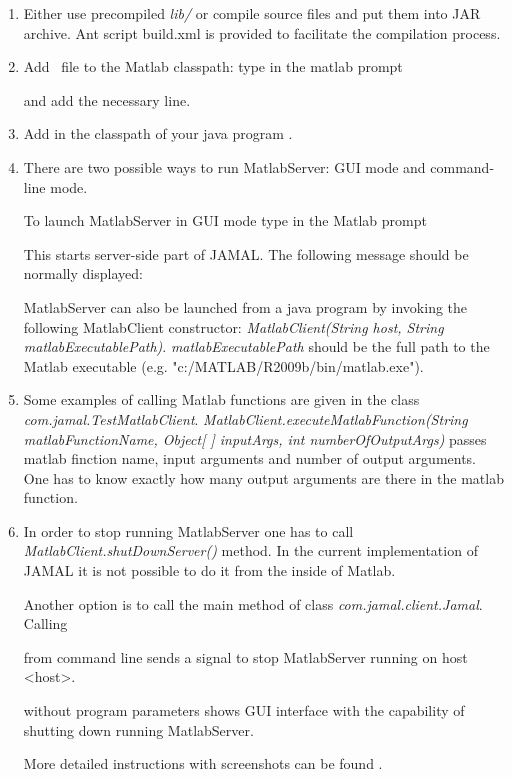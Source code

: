 \documentclass[a4paper,twoside,12pt]{report}
\begin{document}
\begin{enumerate}
	\item   Either use precompiled \emph{lib/\jarName} or compile source files and put them into JAR archive. Ant script build.xml is provided to facilitate the compilation process.
	\item 	Add \jarName~file to the Matlab classpath: type in the matlab prompt  


	 and add the necessary line.
	
		
	\item 	Add in the classpath of your java program \emph{\jarName}.
	

	\item 	
	There are two possible ways to run MatlabServer: GUI mode and command-line mode. 
	
	To launch MatlabServer in GUI mode type in the Matlab prompt 


  This starts server-side part of JAMAL. The following message should be normally displayed: 
  	
			
	MatlabServer can also be launched from a java program by invoking the following MatlabClient constructor: \textit{MatlabClient(String host, String matlabExecutablePath)}. \textit{matlabExecutablePath} should be the full path to the Matlab executable (e.g. "c:/MATLAB/R2009b/bin/matlab.exe"). 

	\item 	Some examples of calling Matlab functions are given in the class \textit{com.\-jamal.\-TestMatlabClient}. 
	\textit{MatlabClient.executeMatlabFunction(String matlabFunctionName, Object[ ] inputArgs, int numberOfOutputArgs)} passes matlab finction name, input arguments and number of output arguments. One has to know exactly how many output arguments are there in the matlab function.
	\item		In order to stop running MatlabServer one has to call \textit{MatlabClient.shutDownServer()} method. In the current implementation of JAMAL it is not possible to do it from the inside of Matlab. 
	
	Another option is to call the main method of class \textit{com.jamal.client.Jamal}. Calling 
	
	
	 from command line sends a signal to stop MatlabServer running on host <host>. 


 without program parameters shows GUI interface with the capability of shutting down running MatlabServer.

More detailed instructions with screenshots can be found .
  
\end{enumerate}
\end{document}
